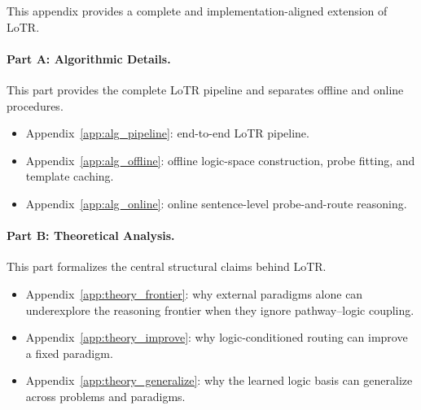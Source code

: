 \clearpage
\onecolumn

\providecommand{\AppBlock}[1]{%
    \vspace{1.0em}
    \noindent{\LARGE\bfseries #1}\par
    \vspace{0.6em}
}

\providecommand{\AppPlaceholder}[2]{%
    \fbox{
        \begin{minipage}[c][#1][c]{0.94\textwidth}
            \centering
            \textit{#2}
        \end{minipage}
    }
}

\AppBlock{Appendix Overview}
\label{app:overview}

This appendix provides a complete and implementation-aligned extension of LoTR.

\paragraph{Part A: Algorithmic Details.}
This part provides the complete LoTR pipeline and separates offline and online procedures.
\begin{itemize}[leftmargin=1.6em]
    \item Appendix~\ref{app:alg_pipeline}: end-to-end LoTR pipeline.
    \item Appendix~\ref{app:alg_offline}: offline logic-space construction, probe fitting, and template caching.
    \item Appendix~\ref{app:alg_online}: online sentence-level probe-and-route reasoning.
\end{itemize}

\paragraph{Part B: Theoretical Analysis.}
This part formalizes the central structural claims behind LoTR.
\begin{itemize}[leftmargin=1.6em]
    \item Appendix~\ref{app:theory_frontier}: why external paradigms alone can underexplore the reasoning frontier when they ignore pathway--logic coupling.
    \item Appendix~\ref{app:theory_improve}: why logic-conditioned routing can improve a fixed paradigm.
    \item Appendix~\ref{app:theory_generalize}: why the learned logic basis can generalize across problems and paradigms.
\end{itemize}

